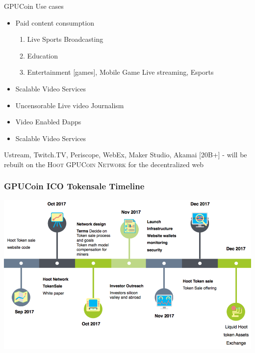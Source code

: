 \documentclass[10pt,handout]{beamer}
\begin{document}
\begin{frame}[fragile]{GPUCoin Use cases}
 \begin{itemize}[<+-| alert@+>]%
	 
\item {Paid content consumption}
\begin{enumerate}[<+-| alert@+>]
\item Live Sports Broadcasting
\item Education 
\item Entertainment [games], Mobile Game Live streaming, Esports
\end{enumerate}
\item {Scalable Video Services}
\item {Uncensorable Live video Journalism}
\item {Video Enabled Ðapps}
\item {Scalable Video Services}

\end{itemize}
\pause

\Large{
Ustream, Twitch.TV, Periscope, WebEx, Maker Studio, Akamai [20B+] - will be rebuilt on the \textsc{Hoot GPUCoin Network} for the decentralized web
}

\end{frame}
\begin{frame}[t]\frametitle{GPUCoin ICO Tokensale Timeline}
     \includegraphics[width=1.0\textwidth]{static/tstimeline-trans}
\end{frame}
\end{document}
